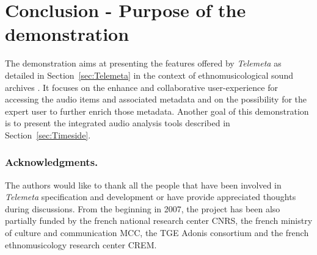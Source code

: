 \documentclass[runningheads,a4paper]{llncs}
\begin{document}
\section{Conclusion - Purpose of the demonstration}
The demonstration aims at presenting the features offered by \emph{Telemeta} as detailed in Section~\ref{sec:Telemeta} in the context of ethnomusicological sound archives \cite{telemetaCREM}. It focuses on the enhance and collaborative user-experience for accessing the audio items and associated metadata and on the possibility for the expert user to further enrich those metadata.
Another goal of this demonstration is to present the integrated audio analysis tools described in Section~\ref{sec:Timeside}.


\subsubsection*{Acknowledgments.} 
The authors would like to thank all the people that have been involved in \emph{Telemeta} specification and development or have provide appreciated thoughts during discussions. From the beginning in 2007, the project has been also partially funded by the french national research center CNRS, the french ministry of culture and 
communication MCC, the TGE Adonis consortium and the french ethnomusicology research center CREM.




\end{document}
